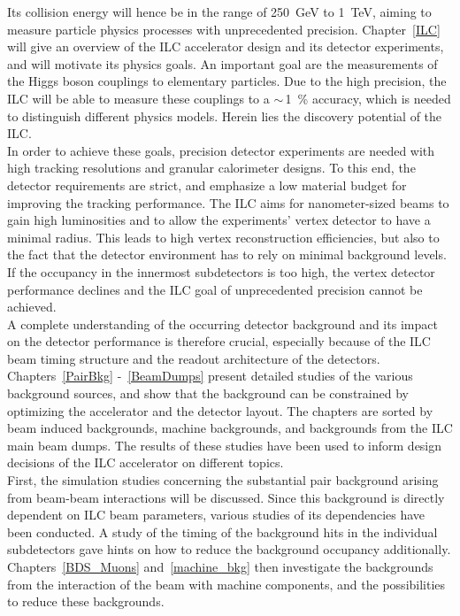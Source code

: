 Its collision energy will hence be in the range of \SI{250}{\GeV} to \SI{1}{\TeV}, aiming to measure particle physics processes with unprecedented precision.
Chapter~\ref{ILC} will give an overview of the ILC accelerator design and its detector experiments, and will motivate its physics goals.
An important goal are the measurements of the Higgs boson couplings to elementary particles.
Due to the high precision, the ILC will be able to measure these couplings to a $\sim$\,\SI{1}{\percent} accuracy, which is needed to distinguish different physics models.
Herein lies the discovery potential of the ILC.
\\In order to achieve these goals, precision detector experiments are needed with high tracking resolutions and granular calorimeter designs.
To this end, the detector requirements are strict, and emphasize a low material budget for improving the tracking performance.
The ILC aims for nanometer-sized beams to gain high luminosities and to allow the experiments' vertex detector to have a minimal radius.
This leads to high vertex reconstruction efficiencies, but also to the fact that the detector environment has to rely on minimal background levels.
If the occupancy in the innermost subdetectors is too high, the vertex detector performance declines and the ILC goal of unprecedented precision cannot be achieved.
\\A complete understanding of the occurring detector background and its impact on the detector performance is therefore crucial, especially because of the ILC beam timing structure and the readout architecture of the detectors.
Chapters~\ref{PairBkg} -~\ref{BeamDumps} present detailed studies of the various background sources, and show that the background can be constrained by optimizing the accelerator and the \sid detector layout.
The chapters are sorted by beam induced backgrounds, machine backgrounds, and backgrounds from the ILC main beam dumps.
The results of these studies have been used to inform design decisions of the ILC accelerator on different topics.
\\First, the simulation studies concerning the substantial \positron\electron pair background arising from beam-beam interactions will be discussed.
Since this background is directly dependent on ILC beam parameters, various studies of its dependencies have been conducted.
A study of the timing of the background hits in the individual \sid subdetectors gave hints on how to reduce the background occupancy additionally.
\\Chapters~\ref{BDS_Muons} and~\ref{machine_bkg} then investigate the backgrounds from the interaction of the beam with machine components, and the possibilities to reduce these backgrounds.
